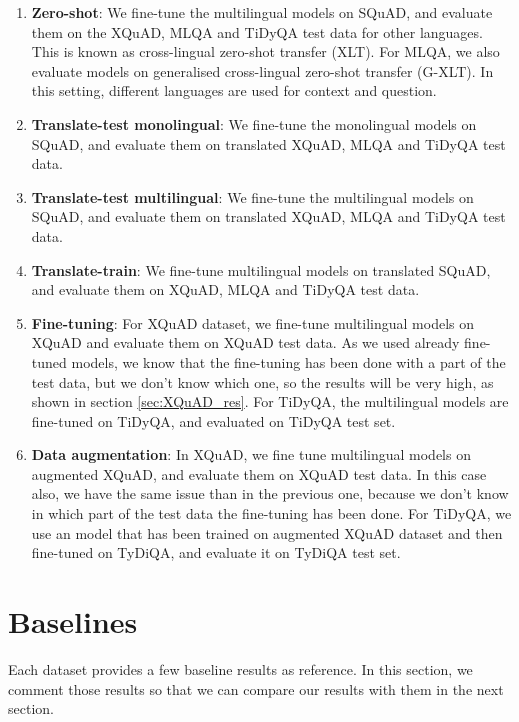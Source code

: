 \documentclass[11pt]{article}
\begin{document}
\begin{enumerate}
    \item \textbf{Zero-shot}: We fine-tune the multilingual models on SQuAD, and evaluate them on the XQuAD, MLQA and TiDyQA test data for other languages. This is known as cross-lingual zero-shot transfer (XLT). For MLQA, we also evaluate models on generalised cross-lingual zero-shot transfer (G-XLT). In this setting, different languages are used for context and question.
    
    \item \textbf{Translate-test monolingual}: We fine-tune the monolingual models on SQuAD, and evaluate them on translated XQuAD, MLQA and TiDyQA test data.
    
    \item \textbf{Translate-test multilingual}: We fine-tune the multilingual models on SQuAD, and evaluate them on translated XQuAD, MLQA and TiDyQA test data.
    
    \item \textbf{Translate-train}: We fine-tune multilingual models on translated SQuAD, and evaluate them on XQuAD, MLQA and TiDyQA test data.
    
    \item \textbf{Fine-tuning}: For XQuAD dataset, we fine-tune multilingual models on XQuAD and evaluate them on XQuAD test data. As we used already fine-tuned models, we know that the fine-tuning has been done with a part of the test data, but we don't know which one, so the results will be very high, as shown in section \ref{sec:XQuAD_res}. For TiDyQA, the multilingual models are fine-tuned on TiDyQA, and evaluated on TiDyQA test set.
    
    \item \textbf{Data augmentation}: In XQuAD, we fine tune multilingual models on augmented XQuAD, and evaluate them on XQuAD test data. In this case also, we have the same issue than in the previous one, because we don't know in which part of the test data the fine-tuning has been done. For TiDyQA, we use an model that has been trained on augmented XQuAD dataset and then fine-tuned on TyDiQA, and evaluate it on TyDiQA test set.
\end{enumerate}

\section{Baselines}

Each dataset provides a few baseline results as reference. In this section, we comment those results so that we can compare our results with them in the next section.
\end{document}
